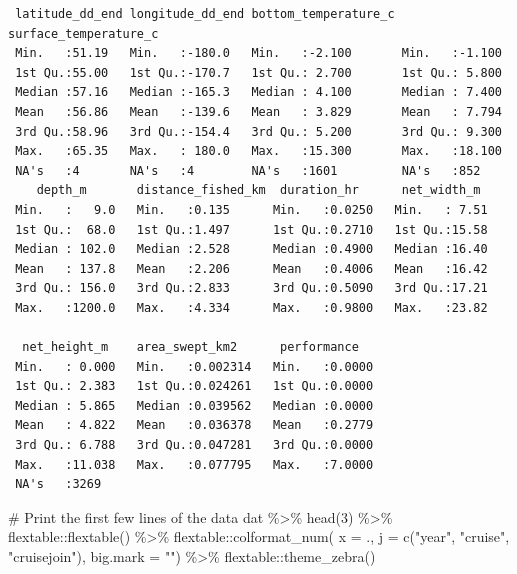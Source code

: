 \documentclass[
  letterpaper,
  oneside,
  open=any]{scrbook}
\newenvironment{Shaded}{\begin{snugshade}}{\end{snugshade}}
\newcommand{\AttributeTok}[1]{\textcolor[rgb]{0.40,0.45,0.13}{#1}}
\newcommand{\CommentTok}[1]{\textcolor[rgb]{0.37,0.37,0.37}{#1}}
\newcommand{\DecValTok}[1]{\textcolor[rgb]{0.68,0.00,0.00}{#1}}
\newcommand{\FunctionTok}[1]{\textcolor[rgb]{0.28,0.35,0.67}{#1}}
\newcommand{\NormalTok}[1]{\textcolor[rgb]{0.00,0.23,0.31}{#1}}
\newcommand{\SpecialCharTok}[1]{\textcolor[rgb]{0.37,0.37,0.37}{#1}}
\newcommand{\StringTok}[1]{\textcolor[rgb]{0.13,0.47,0.30}{#1}}
\begin{document}
\begin{verbatim}
 latitude_dd_end longitude_dd_end bottom_temperature_c surface_temperature_c
 Min.   :51.19   Min.   :-180.0   Min.   :-2.100       Min.   :-1.100       
 1st Qu.:55.00   1st Qu.:-170.7   1st Qu.: 2.700       1st Qu.: 5.800       
 Median :57.16   Median :-165.3   Median : 4.100       Median : 7.400       
 Mean   :56.86   Mean   :-139.6   Mean   : 3.829       Mean   : 7.794       
 3rd Qu.:58.96   3rd Qu.:-154.4   3rd Qu.: 5.200       3rd Qu.: 9.300       
 Max.   :65.35   Max.   : 180.0   Max.   :15.300       Max.   :18.100       
 NA's   :4       NA's   :4        NA's   :1601         NA's   :852          
    depth_m       distance_fished_km  duration_hr      net_width_m   
 Min.   :   9.0   Min.   :0.135      Min.   :0.0250   Min.   : 7.51  
 1st Qu.:  68.0   1st Qu.:1.497      1st Qu.:0.2710   1st Qu.:15.58  
 Median : 102.0   Median :2.528      Median :0.4900   Median :16.40  
 Mean   : 137.8   Mean   :2.206      Mean   :0.4006   Mean   :16.42  
 3rd Qu.: 156.0   3rd Qu.:2.833      3rd Qu.:0.5090   3rd Qu.:17.21  
 Max.   :1200.0   Max.   :4.334      Max.   :0.9800   Max.   :23.82  
                                                                     
  net_height_m    area_swept_km2      performance    
 Min.   : 0.000   Min.   :0.002314   Min.   :0.0000  
 1st Qu.: 2.383   1st Qu.:0.024261   1st Qu.:0.0000  
 Median : 5.865   Median :0.039562   Median :0.0000  
 Mean   : 4.822   Mean   :0.036378   Mean   :0.2779  
 3rd Qu.: 6.788   3rd Qu.:0.047281   3rd Qu.:0.0000  
 Max.   :11.038   Max.   :0.077795   Max.   :7.0000  
 NA's   :3269                                        
\end{verbatim}

\begin{Shaded}
\begin{Highlighting}[]
\CommentTok{\# Print the first few lines of the data }
\NormalTok{dat }\SpecialCharTok{\%\textgreater{}\%} 
  \FunctionTok{head}\NormalTok{(}\DecValTok{3}\NormalTok{) }\SpecialCharTok{\%\textgreater{}\%} 
\NormalTok{  flextable}\SpecialCharTok{::}\FunctionTok{flextable}\NormalTok{() }\SpecialCharTok{\%\textgreater{}\%}
\NormalTok{  flextable}\SpecialCharTok{::}\FunctionTok{colformat\_num}\NormalTok{(}
      \AttributeTok{x =}\NormalTok{ ., }
      \AttributeTok{j =} \FunctionTok{c}\NormalTok{(}\StringTok{"year"}\NormalTok{, }\StringTok{"cruise"}\NormalTok{, }\StringTok{"cruisejoin"}\NormalTok{), }
      \AttributeTok{big.mark =} \StringTok{""}\NormalTok{) }\SpecialCharTok{\%\textgreater{}\%} 
\NormalTok{  flextable}\SpecialCharTok{::}\FunctionTok{theme\_zebra}\NormalTok{()}
\end{Highlighting}
\end{Shaded}
\end{document}
